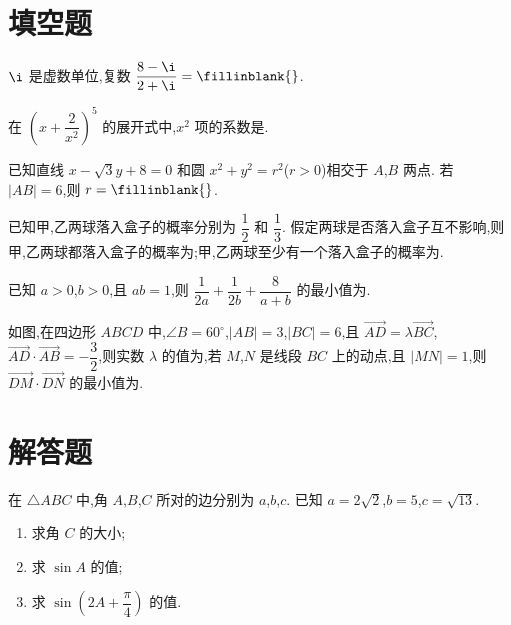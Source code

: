 \section{填空题}

\begin{problem}
\(\i\) 是虚数单位,复数 \(\dfrac{8-\i}{2+\i}=\fillinblank{}\).
\end{problem}

\begin{problem}
在 \(\left( x+\dfrac{2}{x^2} \right)^5\) 的展开式中,\(x^2\) 项的系数是\fillinblank{}.
\end{problem}

\begin{problem}
已知直线 \(x-\sqrt3 y+8=0\) 和圆 \(x^2+y^2=r^2\)(\(r>0\))相交于 \(A\),\(B\) 两点. 若 \(|AB|=6\),则 \(r=\fillinblank{}\).
\end{problem}

\begin{problem}
已知甲,乙两球落入盒子的概率分别为 \(\dfrac12\) 和 \(\dfrac13\). 假定两球是否落入盒子互不影响,则甲,乙两球都落入盒子的概率为\fillinblank{};甲,乙两球至少有一个落入盒子的概率为\fillinblank{}.
\end{problem}

\begin{problem}
已知 \(a>0\),\(b>0\),且 \(ab=1\),则 \(\dfrac1{2a}+\dfrac1{2b}+\dfrac8{a+b}\) 的最小值为\fillinblank{}.
\end{problem}

\begin{problem}
如图,在四边形 \(ABCD\) 中,\(\angle B=60^\circ\),\(|AB|=3\),\(|BC|=6\),且 \(\overrightarrow{AD}=\lambda\overrightarrow{BC}\),\(\overrightarrow{AD}\cdot\overrightarrow{AB}=-\dfrac32\),则实数 \(\lambda\) 的值为\fillinblank{},若 \(M\),\(N\) 是线段 \(BC\) 上的动点,且 \(|MN|=1\),则 \(\overrightarrow{DM}\cdot\overrightarrow{DN}\) 的最小值为\fillinblank{}.

\begin{center}
\end{center}
\end{problem}

\section{解答题}

\begin{problem}
在 \(\triangle ABC\) 中,角 \(A\),\(B\),\(C\) 所对的边分别为 \(a\),\(b\),\(c\). 已知 \(a=2\sqrt2\),\(b=5\),\(c=\sqrt{13}\).

\begin{enumerate}
\item 求角 \(C\) 的大小;
\item 求 \(\sin A\) 的值;
\item 求 \(\sin\left( 2A+\dfrac{\pi}{4} \right)\) 的值.
\end{enumerate}
\end{problem}


